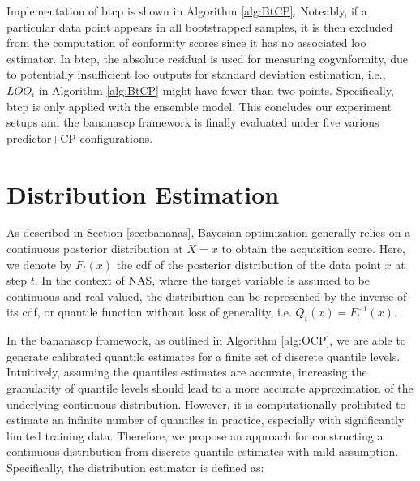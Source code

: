 \documentclass[a4paper,oneside,bibliography=totoc]{scrbook}
\begin{document}
Implementation of \gls{btcp} is shown in Algorithm \ref{alg:BtCP}. Noteably, if a particular  data point appears in all bootstrapped samples, it is then excluded from the computation of conformity scores since it has no associated \gls{loo} estimator. In \gls{btcp}, the absolute residual is used for measuring cogvnformity, due to potentially insufficient \gls{loo} outputs for standard deviation estimation, i.e., $LOO_i$ in Algorithm \ref{alg:BtCP} might have fewer than two points. Specifically, \gls{btcp} is only applied with the ensemble model. This concludes our experiment setups and the \gls{bananascp} framework is finally evaluated under five various predictor+CP configurations.


\section{Distribution Estimation}
\label{sec:distest}
As described in Section \ref{sec:bananas}, Bayesian optimization generally relies on a continuous posterior distribution at $X=x$ to obtain the acquisition score. Here, we denote by $F_t(x)$ the \gls{cdf} of the posterior distribution of the data point $x$ at step $t$. In the context of NAS, where the target variable is assumed to be continuous and real-valued, the distribution can be represented by the inverse of its \gls{cdf}, or quantile function without loss of generality, i.e. $Q_{t}(x) = F^{-1}_{t}(x)$. 

In the \gls{bananascp} framework, as outlined in Algorithm \ref{alg:OCP}, we are able to generate calibrated quantile estimates for a finite set of discrete quantile levels. Intuitively, assuming the quantiles estimates are accurate, increasing the granularity of quantile levels should lead to a more accurate approximation of the underlying continuous distribution. However, it is computationally prohibited to estimate an infinite number of quantiles in practice, especially with significantly limited training data. Therefore, we propose an approach for constructing a continuous distribution from discrete quantile estimates with mild assumption. Specifically, the distribution estimator is defined as:
\end{document}
